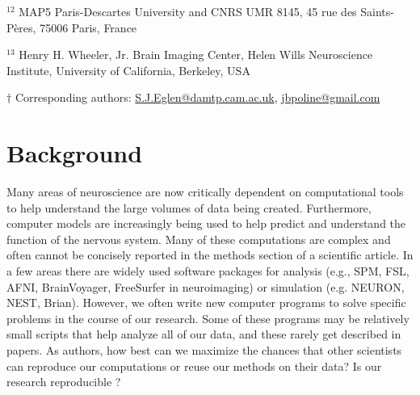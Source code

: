 \documentclass[11pt]{article}
\begin{document}
\noindent $^{12}$ MAP5 Paris-Descartes University and CNRS UMR 8145, 
45 rue des Saints-P\`{e}res, 75006 Paris, France

\noindent $^{13}$  Henry H. Wheeler, Jr. Brain Imaging Center, Helen Wills Neuroscience Institute, University of California, Berkeley, USA

\vspace*{2mm}
\noindent $\dagger$
Corresponding authors: \url{S.J.Eglen@damtp.cam.ac.uk}, \url{jbpoline@gmail.com}

\clearpage


\renewcommand{\cite}[1]{\autocite{#1}}

\linenumbers

\section*{Background}

Many areas of neuroscience are now critically dependent on
computational tools to help understand the large volumes of data being
created.  Furthermore, computer models are increasingly being used to
help predict and understand the function of the nervous system.  Many
of these computations are complex and often cannot be concisely
reported in the methods section of a scientific article.  In a few
areas there are widely used software packages for
analysis (e.g., SPM, FSL, AFNI, BrainVoyager, FreeSurfer in
neuroimaging) or simulation (e.g. NEURON, NEST, Brian).
However, we often write new computer programs to solve
specific problems in the course of our research.  Some of these
programs may be relatively small scripts that help analyze all of our
data, and these rarely get described in papers.  As authors, how best
can we maximize the chances that other scientists can reproduce our
computations or reuse our methods on their data?  Is our research
reproducible \cite{web:naturefocus}?
\end{document}

